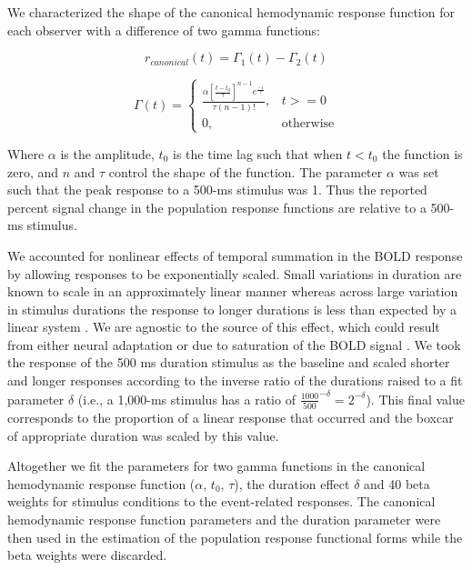 \documentclass{report}
\begin{document}
We characterized the shape of the canonical hemodynamic response function for each observer with a difference of two gamma functions:

\begin{equation}
    r_{canonical}(t) = \Gamma_1(t)-\Gamma_2(t)
\end{equation}

\begin{equation}
    \Gamma(t)=
\begin{cases}
    \frac{\alpha[\frac{t-t_0}{\tau}]^{n-1}e^{\frac{-1}{\tau}}}{\tau(n-1)!},& t >= 0\\
    0,              & \text{otherwise}
\end{cases}
\end{equation}

Where $\alpha$ is the amplitude, $t_0$ is the time lag such that when $t < t_0$ the function is zero, and $n$ and $\tau$ control the shape of the function. The parameter $\alpha$ was set such that the peak response to a 500-ms stimulus was 1. Thus the reported percent signal change in the population response functions are relative to a 500-ms stimulus.

We accounted for nonlinear effects of temporal summation in the BOLD response by allowing responses to be exponentially scaled. Small variations in duration are known to scale in an approximately linear manner \citep{Boynton1996-ff} whereas across large variation in stimulus durations the response to longer durations is less than expected by a linear system \citep{Boynton2012-xy}. We are agnostic to the source of this effect, which could result from either neural adaptation \citep{Buxton2004-rg} or due to saturation of the BOLD signal \citep{Friston1998-bo}. We took the response of the 500 ms duration stimulus as the baseline and scaled shorter and longer responses according to the inverse ratio of the durations raised to a fit parameter $\delta$ (i.e., a 1,000-ms stimulus has a ratio of $\frac{1000}{500}^{-\delta}=2^{-\delta}$). This final value corresponds to the proportion of a linear response that occurred and the boxcar of appropriate duration was scaled by this value.

Altogether we fit the parameters for two gamma functions in the canonical hemodynamic response function ($\alpha$, $t_0$, $\tau$), the duration effect $\delta$ and 40 beta weights for stimulus conditions to the event-related responses. The canonical hemodynamic response function parameters and the duration parameter were then used in the estimation of the population response functional forms while the beta weights were discarded.
\end{document}

